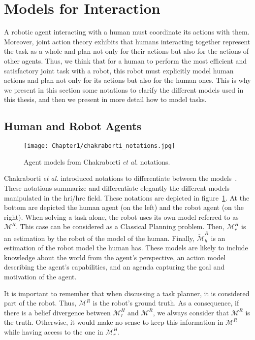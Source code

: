 \section{Models for Interaction}


A robotic agent interacting with a human must coordinate its actions with them. Moreover, joint action theory exhibits that humans interacting together represent the task as a whole and plan not only for their actions but also for the actions of other agents. Thus, we think that for a human to perform the most efficient and satisfactory joint task with a robot, this robot must explicitly model human actions and plan not only for its actions but also for the human ones. This is why we present in this section some notations to clarify the different models used in this thesis, and then we present in more detail how to model tasks.

\subsection{Human and Robot Agents}

\begin{figure}[h]
    \centering
    \texttt{[image: Chapter1/chakraborti\_notations.jpg]}
    \caption{Agent models from Chakraborti \textit{et al.} notations.}
    \label{fig:chakraborti_notations}
\end{figure}

Chakraborti \textit{et al.} introduced notations to differentiate between the models~\cite{ChakrabortiBTZS15}. These notations summarize and differentiate elegantly the different models manipulated in the \acrshort{hri}/\acrshort{hrc} field. These notations are depicted in figure~\ref{fig:chakraborti_notations}. At the bottom are depicted the human agent (on the left) and the robot agent (on the right). When solving a task alone, the robot uses its own model referred to as $\mathcal{M}^R$. This case can be considered as a Classical Planning problem. 
Then, $\mathcal{M}^H_r$ is an estimation by the robot of the model of the human. Finally, $\tilde{\mathcal{M}}^R_h$ is an estimation of the robot model the human has. These models are likely to include knowledge about the world from the agent's perspective, an action model describing the agent's capabilities, and an agenda capturing the goal and motivation of the agent.

It is important to remember that when discussing a task planner, it is considered part of the robot. Thus, $\mathcal{M}^R$ is the robot's ground truth. As a consequence, if there is a belief divergence between $\mathcal{M}^H_r$ and $\mathcal{M}^R$, we always consider that $\mathcal{M}^R$ is the truth. Otherwise, it would make no sense to keep this information in $\mathcal{M}^R$ while having access to the one in $\mathcal{M}^H_r$.

